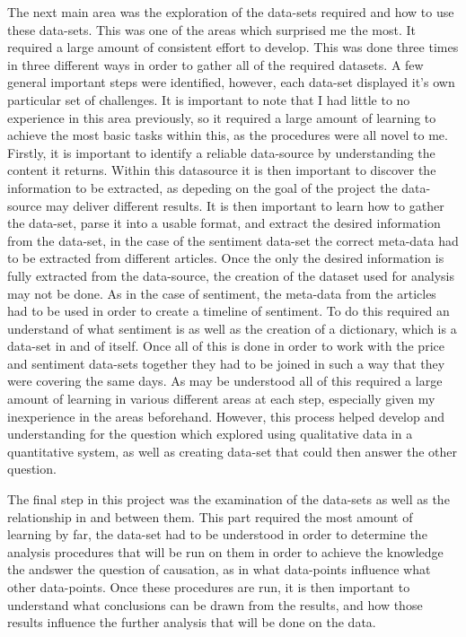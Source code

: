 The next main area was the exploration of the data-sets required and how to use these data-sets. This was one of the areas which surprised me the most. It required a large amount of consistent effort to develop. This was done three times in three different ways in order to gather all of the required datasets. A few general important steps were identified, however, each data-set displayed it's own particular set of challenges. It is important to note that I had little to no experience in this area previously, so it required a large amount of learning to achieve the most basic tasks within this, as the procedures were all novel to me. Firstly, it is important to identify a reliable data-source by understanding the content it returns. Within this datasource it is then important to discover the information to be extracted, as depeding on the goal of the project the data-source may deliver different results. It is then important to learn how to gather the data-set, parse it into a usable format, and extract the desired information from the data-set, in the case of the sentiment data-set the correct meta-data had to be extracted from different articles. Once the only the desired information is fully extracted from the data-source, the creation of the dataset used for analysis may not be done. As in the case of sentiment, the meta-data from the articles had to be used in order to create a timeline of sentiment. To do this required an understand of what sentiment is as well as the creation of a dictionary, which is a data-set in and of itself. Once all of this is done in order to work with the price and sentiment data-sets together they had to be joined in such a way that they were covering the same days. As may be understood all of this required a large amount of learning in various different areas at each step, especially given my inexperience in the areas beforehand. However, this process helped develop and understanding for the question which explored using qualitative data in a quantitative system, as well as creating data-set that could then answer the other question.

The final step in this project was the examination of the data-sets as well as the relationship in and between them. This part required the most amount of learning by far, the data-set had to be understood in order to determine the analysis procedures that will be run on them in order to achieve the knowledge the andswer the question of causation, as in what data-points influence what other data-points. Once these procedures are run, it is then important to understand what conclusions can be drawn from the results, and how those results influence the further analysis that will be done on the data.

